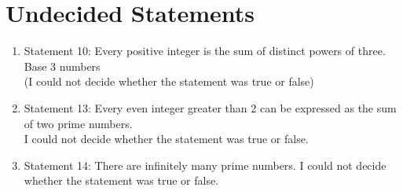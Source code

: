 \documentclass{article}
\begin{document}
\section{Undecided Statements}
\begin{enumerate}
    \item Statement 10: Every positive integer is the sum of distinct powers of three.\newline
          Base 3 numbers \\
          (I could not decide whether the statement was true or false)
    \item Statement 13: Every even integer greater than 2 can be expressed as the sum of two prime numbers.\\
          I could not decide whether the statement was true or false.
    \item Statement 14: There are infinitely many prime numbers.\newline
          I could not decide whether the statement was true or false.
\end{enumerate}
\end{document}
